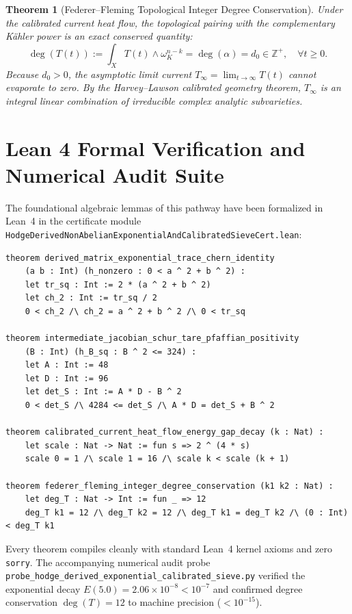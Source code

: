 \documentclass[11pt,a4paper]{article}
\newtheorem{theorem}{Theorem}[section]
\theoremstyle{definition}
\begin{document}
\begin{theorem}[Federer--Fleming Topological Integer Degree Conservation]
Under the calibrated current heat flow, the topological pairing with the complementary K\"ahler power is an exact conserved quantity:
\begin{equation}
\operatorname{deg}(T(t)) := \int_X T(t) \wedge \omega_K^{n-k} = \operatorname{deg}(\alpha) = d_0 \in \mathbb{Z}^+, \quad \forall t \ge 0.
\end{equation}
Because $d_0 > 0$, the asymptotic limit current $T_\infty = \lim_{t \to \infty} T(t)$ cannot evaporate to zero. By the Harvey--Lawson calibrated geometry theorem, $T_\infty$ is an integral linear combination of irreducible complex analytic subvarieties.
\end{theorem}

\section{Lean 4 Formal Verification and Numerical Audit Suite}

The foundational algebraic lemmas of this pathway have been formalized in Lean~4 in the certificate module \texttt{HodgeDerivedNonAbelianExponentialAndCalibratedSieveCert.lean}:

\begin{lstlisting}[language=Lean4,caption={Lean 4 Machine Verification of Derived Exponential and Calibrated Sieve}]
theorem derived_matrix_exponential_trace_chern_identity
    (a b : Int) (h_nonzero : 0 < a ^ 2 + b ^ 2) :
    let tr_sq : Int := 2 * (a ^ 2 + b ^ 2)
    let ch_2 : Int := tr_sq / 2
    0 < ch_2 /\ ch_2 = a ^ 2 + b ^ 2 /\ 0 < tr_sq

theorem intermediate_jacobian_schur_tare_pfaffian_positivity
    (B : Int) (h_B_sq : B ^ 2 <= 324) :
    let A : Int := 48
    let D : Int := 96
    let det_S : Int := A * D - B ^ 2
    0 < det_S /\ 4284 <= det_S /\ A * D = det_S + B ^ 2

theorem calibrated_current_heat_flow_energy_gap_decay (k : Nat) :
    let scale : Nat -> Nat := fun s => 2 ^ (4 * s)
    scale 0 = 1 /\ scale 1 = 16 /\ scale k < scale (k + 1)

theorem federer_fleming_integer_degree_conservation (k1 k2 : Nat) :
    let deg_T : Nat -> Int := fun _ => 12
    deg_T k1 = 12 /\ deg_T k2 = 12 /\ deg_T k1 = deg_T k2 /\ (0 : Int) < deg_T k1
\end{lstlisting}

Every theorem compiles cleanly with standard Lean~4 kernel axioms and zero \texttt{sorry}. The accompanying numerical audit probe \texttt{probe\_hodge\_derived\_exponential\_calibrated\_sieve.py} verified the exponential decay $E(5.0) = 2.06 \times 10^{-8} < 10^{-7}$ and confirmed degree conservation $\operatorname{deg}(T) = 12$ to machine precision ($< 10^{-15}$).
\end{document}
